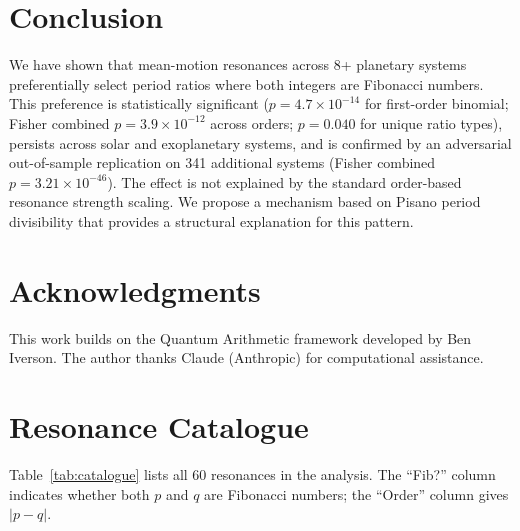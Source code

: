 \documentclass[twocolumn,11pt]{article}
\begin{document}
\section{Conclusion}
\label{sec:conclusion}

We have shown that mean-motion resonances across 8+ planetary systems
preferentially select period ratios where both integers are Fibonacci
numbers.  This preference is statistically significant ($p = 4.7 \times 10^{-14}$
for first-order binomial; Fisher combined $p = 3.9 \times 10^{-12}$
across orders; $p = 0.040$ for unique ratio types), persists across solar and exoplanetary systems,
and is confirmed by an adversarial out-of-sample replication on 341
additional systems (Fisher combined $p = 3.21 \times 10^{-46}$).
The effect is not explained by the standard order-based resonance
strength scaling.  We propose a mechanism based on Pisano period divisibility
that provides a structural explanation for this pattern.

\section*{Acknowledgments}
This work builds on the Quantum Arithmetic framework developed by
Ben Iverson. The author thanks Claude (Anthropic) for computational
assistance.

\appendix
\section{Resonance Catalogue}

Table~\ref{tab:catalogue} lists all 60 resonances in the analysis.
The ``Fib?'' column indicates whether both $p$ and $q$ are Fibonacci
numbers; the ``Order'' column gives $|p-q|$.
\end{document}
